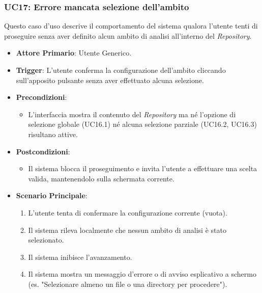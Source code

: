 \documentclass[12pt, a4paper]{article}
\begin{document}
\subsubsection{UC17: Errore mancata selezione dell'ambito}\label{uc:17}
Questo caso d'uso descrive il comportamento del sistema qualora l'utente tenti di proseguire senza aver definito alcun ambito di analisi all'interno del \textit{Repository}.
\begin{itemize}
    \item \textbf{Attore Primario}: Utente Generico.
    \item \textbf{Trigger}: L'utente conferma la configurazione dell'ambito cliccando sull'apposito pulsante senza aver effettuato alcuna selezione.
    \item \textbf{Precondizioni}:\begin{itemize}\item L'interfaccia mostra il contenuto del \textit{Repository} ma né l'opzione di selezione globale (UC16.1) né alcuna selezione parziale (UC16.2, UC16.3) risultano attive.\end{itemize}
    \item \textbf{Postcondizioni}:\begin{itemize}\item Il sistema blocca il proseguimento e invita l'utente a effettuare una scelta valida, mantenendolo sulla schermata corrente.\end{itemize}
    \item \textbf{Scenario Principale}:
    \begin{enumerate}
        \item L'utente tenta di confermare la configurazione corrente (vuota).
        \item Il sistema rileva localmente che nessun ambito di analisi è stato selezionato.
        \item Il sistema inibisce l'avanzamento.
        \item Il sistema mostra un messaggio d'errore o di avviso esplicativo a schermo (es. "Selezionare almeno un file o una directory per procedere").
    \end{enumerate}
\end{itemize}
\end{document}
